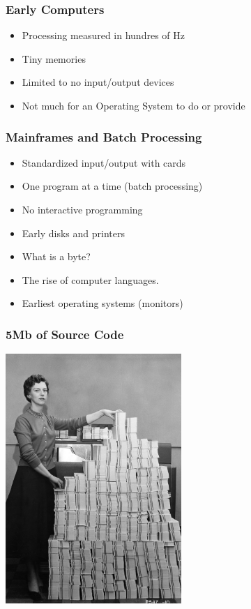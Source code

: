 \documentclass[pdftex]{beamer} %
\begin{document}
\begin{frame}
  \frametitle{Early Computers}
  \begin{itemize}
  \item Processing measured in hundres of Hz
  \item Tiny memories
  \item Limited to no input/output devices
  \item Not much for an Operating System to do or provide
  \end{itemize}
\end{frame}

\begin{frame}
  \frametitle{Mainframes and Batch Processing}
  \begin{itemize}
  \item Standardized input/output with cards
  \item One program at a time (batch processing)
  \item No interactive programming
  \item Early disks and printers
  \item What is a byte?
  \item The rise of computer languages.
  \item Earliest operating systems (monitors)
  \end{itemize}
\end{frame}

\begin{frame}
  \frametitle{5Mb of Source Code}
  \centering
  \includegraphics[width=0.5\textwidth]{../../figures/punched-cards-5mb.jpg}  
\end{frame}
\end{document}
